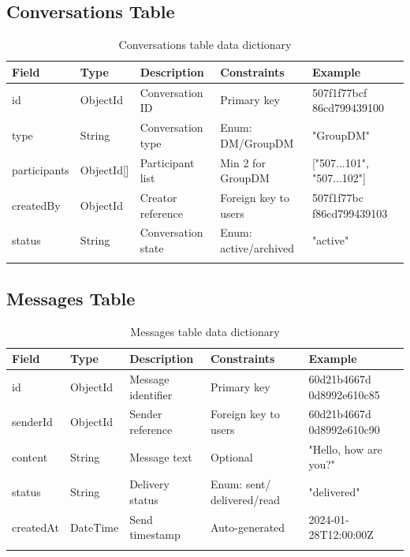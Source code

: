 \subsection{Conversations Table}
\begin{longtable}{|L{3cm}|C{2cm}|L{2.5cm}|L{3cm}|L{3cm}|}
\hline
\textbf{Field} & \textbf{Type} & \textbf{Description} & \textbf{Constraints} & \textbf{Example} \\ \hline
\endhead

id & ObjectId & Conversation ID & Primary key & 507f1f77bcf 86cd799439100 \\ \hline
type & String & Conversation type & Enum: DM/GroupDM & "GroupDM" \\ \hline
participants & ObjectId[] & Participant list & Min 2 for GroupDM & ["507...101", "507...102"] \\ \hline
createdBy & ObjectId & Creator reference & Foreign key to users & 507f1f77bc f86cd799439103 \\ \hline
status & String & Conversation state & Enum: active/archived & "active" \\ \hline

\caption{Conversations table data dictionary}
\label{tab:conversations_dict}
\end{longtable}

\subsection{Messages Table}
\begin{longtable}{|L{3cm}|C{2cm}|L{2.5cm}|L{3cm}|L{3cm}|}
\hline
\textbf{Field} & \textbf{Type} & \textbf{Description} & \textbf{Constraints} & \textbf{Example} \\ \hline
\endhead

id & ObjectId & Message identifier & Primary key & 60d21b4667d 0d8992e610c85 \\ \hline
senderId & ObjectId & Sender reference & Foreign key to users & 60d21b4667d 0d8992e610c90 \\ \hline
content & String & Message text & Optional & "Hello, how are you?" \\ \hline
status & String & Delivery status & Enum: sent/ delivered/read & "delivered" \\ \hline
createdAt & DateTime & Send timestamp & Auto-generated & 2024-01-28T12:00:00Z \\ \hline

\caption{Messages table data dictionary}
\label{tab:messages_dict}
\end{longtable}

